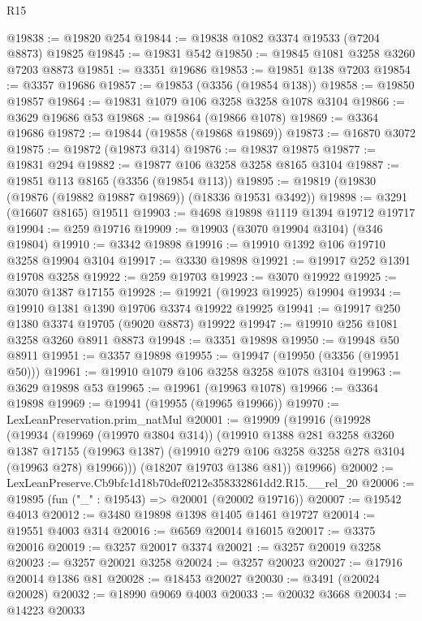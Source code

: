 \begin{lexlean}{R15}
\begin{coremodule}
@19838 := @19820 @254
@19844 := @19838 @1082 @3374 @19533 (@7204 @8873) @19825
@19845 := @19831 @542
@19850 := @19845 @1081 @3258 @3260 @7203 @8873
@19851 := @3351 @19686
@19853 := @19851 @138 @7203
@19854 := @3357 @19686
@19857 := @19853 (@3356 (@19854 @138))
@19858 := @19850 @19857
@19864 := @19831 @1079 @106 @3258 @3258 @1078 @3104
@19866 := @3629 @19686 @53
@19868 := @19864 (@19866 @1078)
@19869 := @3364 @19686
@19872 := @19844 (@19858 (@19868 @19869))
@19873 := @16870 @3072
@19875 := @19872 (@19873 @314)
@19876 := @19837 @19875
@19877 := @19831 @294
@19882 := @19877 @106 @3258 @3258 @8165 @3104
@19887 := @19851 @113 @8165 (@3356 (@19854 @113))
@19895 := @19819 (@19830 (@19876 (@19882 @19887 @19869)) (@18336 @19531 @3492))
@19898 := @3291 (@16607 @8165) @19511
@19903 := @4698 @19898 @1119 @1394 @19712 @19717
@19904 := @259 @19716
@19909 := @19903 (@3070 @19904 @3104) (@346 @19804)
@19910 := @3342 @19898
@19916 := @19910 @1392 @106 @19710 @3258 @19904 @3104
@19917 := @3330 @19898
@19921 := @19917 @252 @1391 @19708 @3258
@19922 := @259 @19703
@19923 := @3070 @19922
@19925 := @3070 @1387 @17155
@19928 := @19921 (@19923 @19925) @19904
@19934 := @19910 @1381 @1390 @19706 @3374 @19922 @19925
@19941 := @19917 @250 @1380 @3374 @19705 (@9020 @8873) @19922
@19947 := @19910 @256 @1081 @3258 @3260 @8911 @8873
@19948 := @3351 @19898
@19950 := @19948 @50 @8911
@19951 := @3357 @19898
@19955 := @19947 (@19950 (@3356 (@19951 @50)))
@19961 := @19910 @1079 @106 @3258 @3258 @1078 @3104
@19963 := @3629 @19898 @53
@19965 := @19961 (@19963 @1078)
@19966 := @3364 @19898
@19969 := @19941 (@19955 (@19965 @19966))
@19970 := LexLeanPreservation.prim_natMul
@20001 := @19909
    (@19916
      (@19928
        (@19934
          (@19969 (@19970 @3804 @314))
          (@19910
            @1388
            @281
            @3258
            @3260
            @1387
            @17155
            (@19963 @1387)
            (@19910 @279 @106 @3258 @3258 @278 @3104 (@19963 @278) @19966)))
        (@18207 @19703 @1386 @81))
      @19966)
@20002 := LexLeanPreserve.Cb9bfc1d18b70def0212e358332861dd2.R15.__rel_20
@20006 := @19895 (fun ("_" : @19543) => @20001 (@20002 @19716))
@20007 := @19542 @4013
@20012 := @3480 @19898 @1398 @1405 @1461 @19727
@20014 := @19551 @4003 @314
@20016 := @6569 @20014 @16015
@20017 := @3375 @20016
@20019 := @3257 @20017 @3374
@20021 := @3257 @20019 @3258
@20023 := @3257 @20021 @3258
@20024 := @3257 @20023
@20027 := @17916 @20014 @1386 @81
@20028 := @18453 @20027
@20030 := @3491 (@20024 @20028)
@20032 := @18990 @9069 @4003
@20033 := @20032 @3668
@20034 := @14223 @20033

\end{coremodule}
\end{lexlean}
